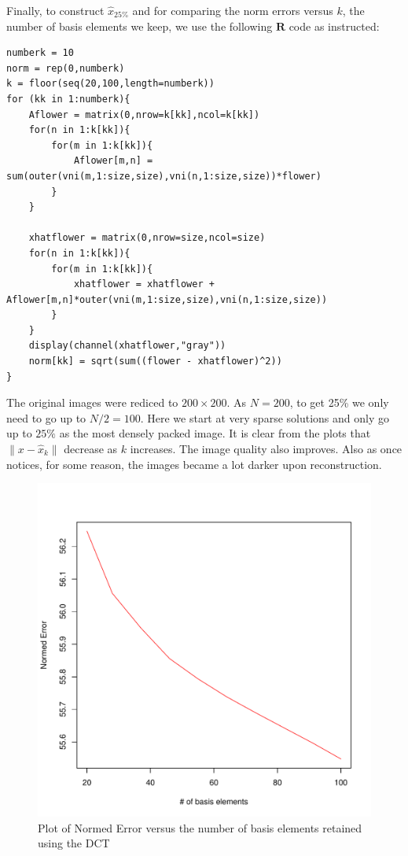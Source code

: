 \documentclass[12pt, leqno]{article}
\providecommand{\norm}[1]{\lVert#1\rVert} %
\begin{document}
Finally, to construct $\hat{x}_{25\%}$ and for comparing the norm errors versus $k$, the number of basis elements we keep, we use the following $\mathbf{R}$ code as instructed:
\begin{verbatim}
numberk = 10
norm = rep(0,numberk)
k = floor(seq(20,100,length=numberk))
for (kk in 1:numberk){
    Aflower = matrix(0,nrow=k[kk],ncol=k[kk])
    for(n in 1:k[kk]){
        for(m in 1:k[kk]){
            Aflower[m,n] = 
sum(outer(vni(m,1:size,size),vni(n,1:size,size))*flower)
        }
    }

    xhatflower = matrix(0,nrow=size,ncol=size)
    for(n in 1:k[kk]){
        for(m in 1:k[kk]){
            xhatflower = xhatflower + 
Aflower[m,n]*outer(vni(m,1:size,size),vni(n,1:size,size))
        }
    }
    display(channel(xhatflower,"gray"))
    norm[kk] = sqrt(sum((flower - xhatflower)^2))
}
\end{verbatim}
The original images were rediced to $200 \times 200$. As $N = 200$, to get 25\% we only need to go up to $N/2 = 100$. Here we start at very sparse solutions and only go up to $25\%$ as the most densely packed image. It is clear from the plots that $\norm{x - \hat{x}_k}$ decrease as $k$ increases. The image quality also improves. Also as once notices, for some reason, the images became a lot darker upon reconstruction.  

\begin{figure}[H]
\begin{center}
  \includegraphics[scale=0.4]{norm2.pdf}
\end{center}
\caption{Plot of Normed Error versus the number of basis elements retained using the DCT} 
\label{fig:hw1p1}
\end{figure}
\end{document}

